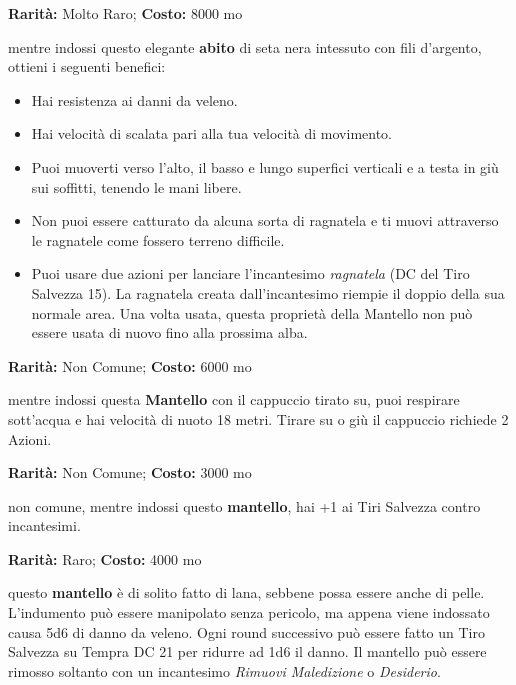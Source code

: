 \begin{multicols}{2}

\textbf{Rarità:} Molto Raro; \textbf{Costo:} 8000 mo

mentre indossi questo elegante \textbf{abito} di seta nera intessuto con fili d'argento, ottieni i seguenti benefici:

\medskip

\begin{itemize}[leftmargin=*] \setlength{\itemsep}{0pt}
\item
Hai resistenza ai danni da veleno.
\item
Hai velocità di scalata pari alla tua velocità di movimento.
\item
Puoi muoverti verso l'alto, il basso e lungo superfici verticali e a testa in giù sui soffitti, tenendo le mani libere.
\item
Non puoi essere catturato da alcuna sorta di ragnatela e ti muovi attraverso le ragnatele come fossero terreno difficile.
\item
Puoi usare due azioni per lanciare l'incantesimo \emph{ragnatela} (DC del Tiro Salvezza 15). La ragnatela creata dall'incantesimo riempie il doppio della sua normale area. Una volta usata, questa proprietà della Mantello non può essere usata di nuovo fino alla prossima alba.
\end{itemize}


\textbf{Rarità:} Non Comune; \textbf{Costo:} 6000 mo

mentre indossi questa \textbf{Mantello} con il cappuccio tirato su, puoi respirare sott'acqua e hai velocità di nuoto 18 metri. Tirare su o giù il cappuccio richiede 2 Azioni.


\textbf{Rarità:} Non Comune; \textbf{Costo:} 3000 mo

non comune, mentre indossi questo \textbf{mantello}, hai +1 ai Tiri Salvezza contro incantesimi.


\textbf{Rarità:} Raro; \textbf{Costo:} 4000 mo

questo \textbf{mantello} è di solito fatto di lana, sebbene possa essere anche di pelle. L'indumento può essere manipolato senza pericolo, ma appena viene indossato causa 5d6 di danno da veleno. Ogni round successivo può essere fatto un Tiro Salvezza su Tempra DC 21 per ridurre ad 1d6 il danno. Il mantello può essere rimosso soltanto con un incantesimo \emph{Rimuovi Maledizione} o \emph{Desiderio}.


\end{multicols}

